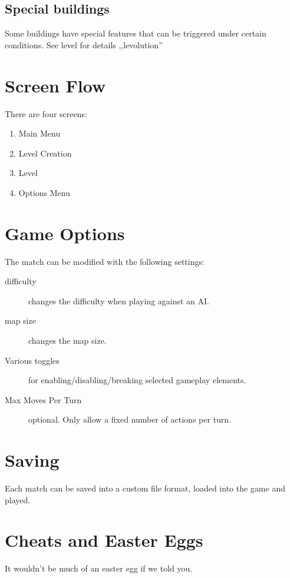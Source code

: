 \subsection{Special buildings} %
Some buildings have special features that can be triggered under certain conditions. See level for details
,,levolution''
\section{Screen Flow} %
There are four screens:

\begin{enumerate}
    \item Main Menu
    \item Level Creation
    \item Level
    \item Options Menu
\end{enumerate}
\section{Game Options} %
The match can be modified with the following settings:

\begin{description}
    \item[difficulty] changes the difficulty when playing against an AI.
    \item[map size] changes the map size.
    \item[Various toggles] for enabling/disabling/breaking selected gameplay elements.
    \item[Max Moves Per Turn] optional. Only allow a fixed number of actions per turn.
\end{description}
\section{Saving} %
Each match can be saved into a custom file format, loaded into the game and played.
\section{Cheats and Easter Eggs} %
It wouldn't be much of an easter egg if we told you.
